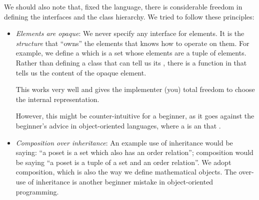 We should also note that, fixed the language, there is considerable freedom in defining the interfaces and the class hierarchy.
We tried to follow these principles:
\begin{itemize}
    \item \emph{Elements are opaque}: We never specify any interface for elements.
          It is the \emph{structure} that ``owns'' the elements that knows how to operate on them.
          For example, we define a  which is a set whose elements are a tuple of elements.
          Rather than defining a class  that can tell us its , there is a  function  in  that tells us the content of the opaque element.

          This works very well and gives the implementer (you) total freedom to choose the internal representation.

          However, this might be counter-intuitive for a beginner, as it goes against the beginner's advice in object-oriented languages, where a  is an  that .

    \item \emph{Composition over inheritance}: An example use of inheritance would be saying: ``a poset is a set which also has an order relation''; composition would be saying ``a poset is a tuple of a set and an order relation''.
          We adopt composition, which is also the way we define mathematical objects.
          The over-use of inheritance is another beginner mistake in object-oriented programming.
\end{itemize}
